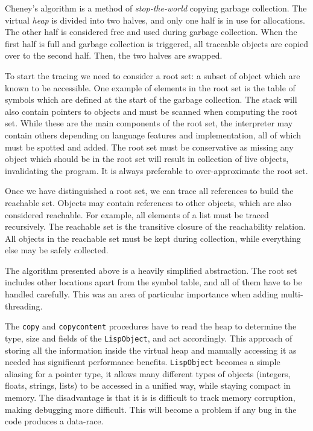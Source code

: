 Cheney's algorithm \cite{cheney} is a method of \emph{stop-the-world} copying garbage collection.
The virtual \emph{heap} is divided into
two halves, and only one half is in use for allocations. The other half is considered free and used during garbage
collection. When the first half is full and garbage collection is triggered, all traceable objects are copied over
to the second half. Then, the two halves are swapped.

To start the tracing we need to consider a root set: a subset of object which are known to be accessible.
One example of elements in the root set is the table of symbols which are defined at the start
of the garbage collection. The stack will also contain pointers to objects and must be scanned when computing the root set.
While these are the main components of the root set, the interpreter may contain others depending on language features
and implementation, all of which must be spotted and added. The root set must be conservative as missing any object which
should be in the root set will result in collection of live objects, invalidating the program. It is always
preferable to over-approximate the root set.

Once we have distinguished a root set, we can trace all references to build the reachable set. Objects may contain references
to other objects, which are also considered reachable. For example, all elements of a list must be traced recursively.
The reachable set is the transitive closure of the reachability relation. All objects in the reachable set must be kept
during collection, while everything else may be safely collected.

The algorithm presented above is a heavily simplified abstraction. The root set includes other
locations apart from the symbol table, and all of them have to be handled carefully. This was an area
of particular importance when adding multi-threading.

The \texttt{copy} and \texttt{copycontent} procedures have to read the heap to determine the type, size and fields of
the \texttt{LispObject}, and act accordingly. This approach of storing all the information inside the virtual heap
and manually accessing it as needed has significant performance benefits. \texttt{LispObject} becomes a simple aliasing
for a pointer type, it allows many different types of objects (integers, floats, strings, lists) to be accessed
in a unified way, while staying compact in memory. The disadvantage is that it is is difficult to track memory
corruption, making debugging more difficult. This will become a problem if any bug in the code produces a data-race.

